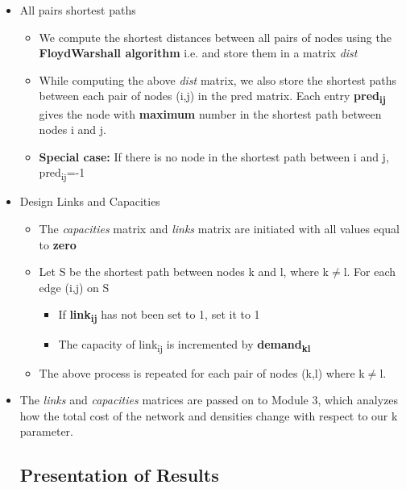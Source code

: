 \documentclass[12pt,letterpaper,titlepage,en-US]{article}
\begin{document}
\begin{itemize}

\item All pairs shortest paths
\begin{itemize}
\item We compute the shortest distances between all pairs of nodes using the \textbf{FloydWarshall algorithm} i.e. and store them in a  matrix \textit{dist}

\item While computing the above \textit{dist} matrix, we also store the shortest paths between each pair of nodes (i,j) in the pred matrix. Each entry \textbf{pred\textsubscript{ij}} gives the node with \textbf{maximum} number in the shortest path between nodes i and j. 

\item \textbf{Special case:} If there is no node in the shortest path between i and j, pred\textsubscript{ij}=-1
\end{itemize}

\item Design Links and Capacities
\begin{itemize}
\item The \textit{capacities} matrix and \textit{links} matrix are initiated with all values equal to \textbf{zero}

\item Let S be the shortest path between nodes k and l, where k$\neq$l. For each edge (i,j) on S  
\begin{itemize}
\item If  \textbf{link\textsubscript{ij}} has not been set to 1, set it to 1 
\item The capacity of link\textsubscript{ij}  is incremented by \textbf{demand\textsubscript{kl}} 

\end{itemize}

\item The above process is repeated for each pair of nodes (k,l) where k$\neq$l.

\end{itemize}


\item The \textit{links} and \textit{capacities} matrices are passed on to Module 3, which analyzes how the total cost of the network and densities change with respect to our k parameter.


\subsection{Presentation of Results}
\begin{itemize}


\end{itemize}
\end{itemize}
\end{document}

